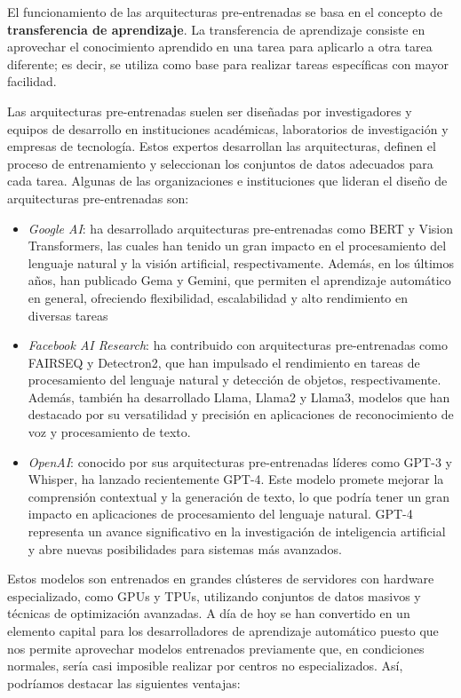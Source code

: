 \documentclass[
  a4paper,
  DIV=11,
  numbers=noendperiod]{scrreprt}
\providecommand{\tightlist}{%
  \setlength{\itemsep}{0pt}\setlength{\parskip}{0pt}}\usepackage{longtable,booktabs,array}
\begin{document}
El funcionamiento de las arquitecturas pre-entrenadas se basa en el
concepto de \textbf{transferencia de aprendizaje}. La transferencia de
aprendizaje consiste en aprovechar el conocimiento aprendido en una
tarea para aplicarlo a otra tarea diferente; es decir, se utiliza como
base para realizar tareas específicas con mayor facilidad.

Las arquitecturas pre-entrenadas suelen ser diseñadas por investigadores
y equipos de desarrollo en instituciones académicas, laboratorios de
investigación y empresas de tecnología. Estos expertos desarrollan las
arquitecturas, definen el proceso de entrenamiento y seleccionan los
conjuntos de datos adecuados para cada tarea. Algunas de las
organizaciones e instituciones que lideran el diseño de arquitecturas
pre-entrenadas son:

\begin{itemize}
\tightlist
\item
  \emph{Google AI}: ha desarrollado arquitecturas pre-entrenadas como
  BERT y Vision Transformers, las cuales han tenido un gran impacto en
  el procesamiento del lenguaje natural y la visión artificial,
  respectivamente. Además, en los últimos años, han publicado Gema y
  Gemini, que permiten el aprendizaje automático en general, ofreciendo
  flexibilidad, escalabilidad y alto rendimiento en diversas tareas
\item
  \emph{Facebook AI Research}: ha contribuido con arquitecturas
  pre-entrenadas como FAIRSEQ y Detectron2, que han impulsado el
  rendimiento en tareas de procesamiento del lenguaje natural y
  detección de objetos, respectivamente. Además, también ha desarrollado
  Llama, Llama2 y Llama3, modelos que han destacado por su versatilidad
  y precisión en aplicaciones de reconocimiento de voz y procesamiento
  de texto.
\item
  \emph{OpenAI}: conocido por sus arquitecturas pre-entrenadas líderes
  como GPT-3 y Whisper, ha lanzado recientemente GPT-4. Este modelo
  promete mejorar la comprensión contextual y la generación de texto, lo
  que podría tener un gran impacto en aplicaciones de procesamiento del
  lenguaje natural. GPT-4 representa un avance significativo en la
  investigación de inteligencia artificial y abre nuevas posibilidades
  para sistemas más avanzados.
\end{itemize}

Estos modelos son entrenados en grandes clústeres de servidores con
hardware especializado, como GPUs y TPUs, utilizando conjuntos de datos
masivos y técnicas de optimización avanzadas. A día de hoy se han
convertido en un elemento capital para los desarrolladores de
aprendizaje automático puesto que nos permite aprovechar modelos
entrenados previamente que, en condiciones normales, sería casi
imposible realizar por centros no especializados. Así, podríamos
destacar las siguientes ventajas:
\end{document}

